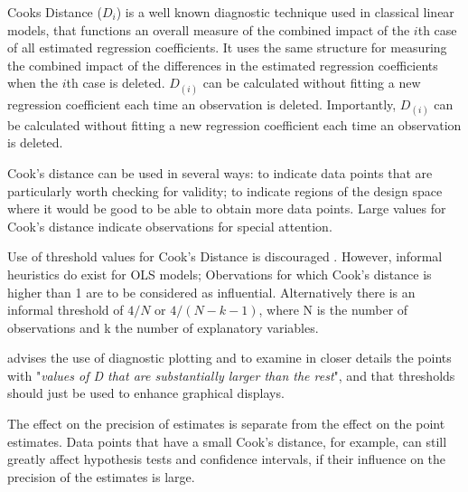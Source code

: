 \documentclass[12pt, a4paper]{report}
\theoremstyle{plain}
\theoremstyle{definition}
\theoremstyle{remark}
\begin{document}
		
	
	 Cooks Distance ($D_{i}$) is a well known diagnostic technique used in classical linear models, that functions an overall measure of the combined impact of the $i$th case of all estimated regression coefficients. It uses the same structure for measuring the combined impact of the differences in the estimated regression coefficients when the $i$th case is deleted. $D_{(i)}$ can be calculated without fitting a new regression coefficient each time an observation is deleted. Importantly, $D_{(i)}$ can be calculated without fitting a new regression coefficient each time an observation is deleted.
	
	
	Cook's distance can be used in several ways: to indicate data points that are particularly worth checking for validity; to indicate regions of the design space where it would be good to be able to obtain more data points. 
	Large values for Cook's distance indicate observations for special attention. 

		
	Use of threshold values for Cook's Distance is discouraged \citep{fox1997}. However, informal heuristics do exist for OLS models; Obervations for which Cook's distance is higher than 1 are to be considered as influential. Alternatively there is an informal threshold of $4/N$ or $4/(N−k−1)$, where N is the number of observations and k the number of explanatory variables.
	
	
	
	\citet{fox1997} advises the use of diagnostic plotting and to examine in closer details the points with "\textit{values of D that are substantially larger than the rest}", and that thresholds should just be used to enhance graphical displays.

		
		The effect on the precision of estimates is separate from the effect on the point estimates. Data points that have a small Cook's distance, for example, can still greatly affect hypothesis tests and confidence intervals, if their  influence on the precision of the estimates is large.
\end{document}
